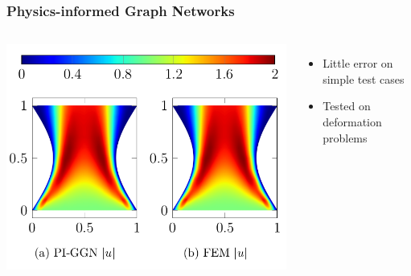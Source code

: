 \documentclass{beamer}
\begin{document}
\begin{frame}
    \frametitle{Physics-informed Graph Networks}
\begin{columns}
\includegraphics[scale=0.2]{figures/PIGNN_error.png}
\begin{itemize}
    \item Little error on simple test cases
    \item Tested on deformation problems
\end{itemize}
\end{columns}
\end{frame}
\end{document}
